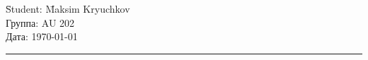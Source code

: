 \begin{tabbing}
\hspace{11cm} \= Student: \= Maksim Kryuchkov \\
  \> Группа: \> AU 202 \\
  \> Дата: \> \today
\end{tabbing}
\hrule
\vspace{1cm}

